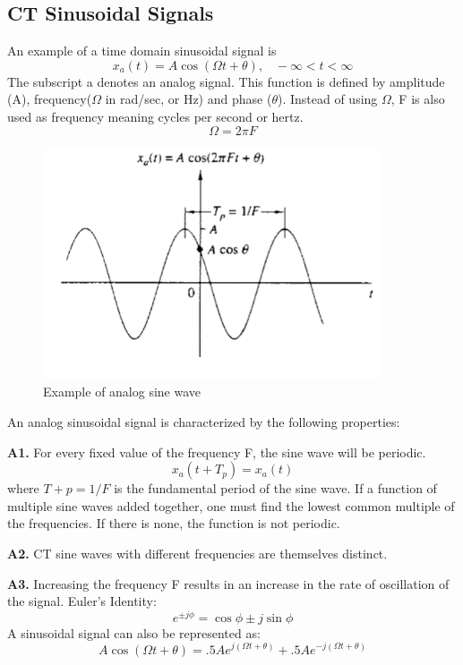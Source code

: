 \documentclass{article} %
\begin{document}
    \subsection{CT Sinusoidal Signals}
    An example of a time domain sinusoidal signal is
    \begin{equation}  
	x_a(t) = A\cos(\Omega t + \theta), \;\;\;-\infty < t < \infty     
    \end{equation}
    The subscript a denotes an analog signal. This function is defined by amplitude (A), frequency($\Omega$ in rad/sec, or Hz) and phase ($\theta$). Instead of using $\Omega$, F is also used
    as frequency meaning cycles per second or hertz.
    \begin{equation}  
	\Omega = 2 \pi F    
    \end{equation}
    
    \begin{figure}[h]
    \centering
	\includegraphics[width=10cm]{ct_sin}
	\caption{Example of analog sine wave}
	\end{figure}
	
	An analog sinusoidal signal is characterized by the following properties:
	
	\textbf{A1.} For every fixed value of the frequency F, the sine wave will be periodic.
	\begin{equation}  
	x_a(t + T_p) = x_a(t)  
    \end{equation}
    where $T+p = 1/F$ is the fundamental period of the sine wave. If a function of multiple sine waves added together, one must find the lowest common multiple of the frequencies. If there is none, the function is not periodic.
    
    \textbf{A2.} CT sine waves with different frequencies are themselves distinct. 
    
    \textbf{A3.} Increasing the frequency F results in an increase in the rate of oscillation of the signal.
    Euler's Identity:
    \begin{equation}  
	e^{\pm j\phi} = \cos\phi \pm j\sin\phi
    \end{equation}
    A sinusoidal signal can also be represented as:
    \begin{equation}
	A\cos (\Omega t + \theta) = .5A e^{j(\Omega t + \theta)} + .5Ae^{-j(\Omega t + \theta)}
    \end{equation}
    
\end{document}
